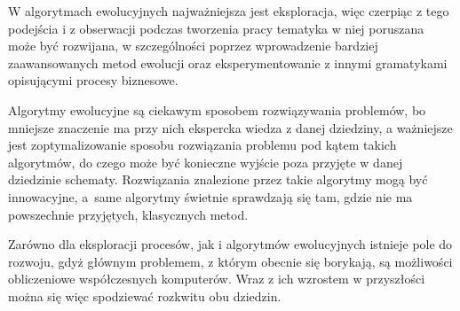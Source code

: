 W algorytmach ewolucyjnych najważniejsza jest eksploracja, więc czerpiąc z tego podejścia i z obserwacji podczas tworzenia pracy tematyka w niej poruszana może być rozwijana, w szczególności poprzez wprowadzenie bardziej zaawansowanych metod ewolucji oraz eksperymentowanie z innymi gramatykami opisującymi procesy biznesowe. 

Algorytmy ewolucyjne są ciekawym sposobem rozwiązywania problemów, bo mniejsze znaczenie ma przy nich ekspercka wiedza z danej dziedziny, a ważniejsze jest zoptymalizowanie sposobu rozwiązania problemu pod kątem takich algorytmów, do czego może być konieczne wyjście poza przyjęte w danej dziedzinie schematy. Rozwiązania znalezione przez takie algorytmy mogą być innowacyjne, a~same algorytmy świetnie sprawdzają się tam, gdzie nie ma powszechnie przyjętych, klasycznych metod. 

Zarówno dla eksploracji procesów, jak i algorytmów ewolucyjnych istnieje pole do rozwoju, gdyż głównym problemem, z którym obecnie się borykają, są możliwości obliczeniowe współczesnych komputerów. Wraz z ich wzrostem w przyszłości można się więc spodziewać rozkwitu obu dziedzin. 


